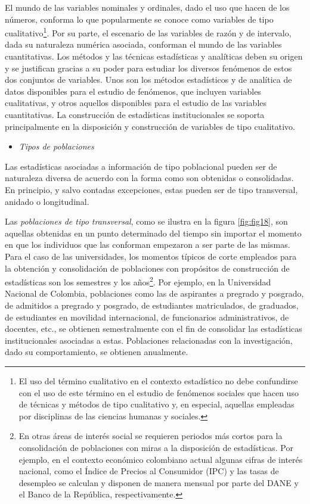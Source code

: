 \documentclass[
]{book}
\providecommand{\tightlist}{%
  \setlength{\itemsep}{0pt}\setlength{\parskip}{0pt}}
\begin{document}
El mundo de las variables nominales y ordinales, dado el uso que hacen de los números, conforma lo que popularmente se conoce como variables de tipo cualitativo\footnote{El uso del término cualitativo en el contexto estadístico no debe confundirse con el uso de este término en el estudio de fenómenos sociales que hacen uso de técnicas y métodos de tipo cualitativo y, en especial, aquellas empleadas por disciplinas de las ciencias humanas y sociales.}. Por su parte, el escenario de las variables de razón y de intervalo, dada su naturaleza numérica asociada, conforman el mundo de las variables cuantitativas. Los métodos y las técnicas estadísticas y analíticas deben su origen y se justifican gracias a su poder para estudiar los diversos fenómenos de estos dos conjuntos de variables. Unos son los métodos estadísticos y de analítica de datos disponibles para el estudio de fenómenos, que incluyen variables cualitativas, y otros aquellos disponibles para el estudio de las variables cuantitativas. La construcción de estadísticas institucionales se soporta principalmente en la disposición y construcción de variables de tipo cualitativo.

\begin{itemize}
\tightlist
\item
  \emph{Tipos de poblaciones}
\end{itemize}

Las estadísticas asociadas a información de tipo poblacional pueden ser de naturaleza diversa de acuerdo con la forma como son obtenidas o consolidadas. En principio, y salvo contadas excepciones, estas pueden ser de tipo transversal, anidado o longitudinal.

Las \emph{poblaciones de tipo transversal}, como se ilustra en la figura \ref{fig:fig18}, son aquellas obtenidas en un punto determinado del tiempo sin importar el momento en que los individuos que las conforman empezaron a ser parte de las mismas. Para el caso de las universidades, los momentos típicos de corte empleados para la obtención y consolidación de poblaciones con propósitos de construcción de estadísticas son los semestres y los años\footnote{En otras áreas de interés social se requieren periodos más cortos para la consolidación de poblaciones con miras a la disposición de estadísticas. Por ejemplo, en el contexto económico colombiano actual algunas cifras de interés nacional, como el Índice de Precios al Consumidor (IPC) y las tasas de desempleo se calculan y disponen de manera mensual por parte del DANE y el Banco de la República, respectivamente.}. Por ejemplo, en la Universidad Nacional de Colombia, poblaciones como las de aspirantes a pregrado y posgrado, de admitidos a pregrado y posgrado, de estudiantes matriculados, de graduados, de estudiantes en movilidad internacional, de funcionarios administrativos, de docentes, etc., se obtienen semestralmente con el fin de consolidar las estadísticas institucionales asociadas a estas. Poblaciones relacionadas con la investigación, dado su comportamiento, se obtienen anualmente.
\end{document}
